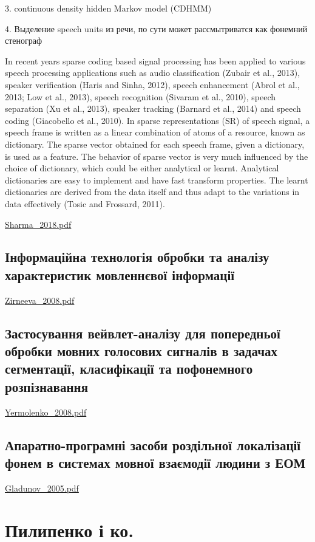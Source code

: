 3. continuous density hidden Markov model
(CDHMM)

4. Выделение speech units из речи, по сути может рассмытриватся как фонемний стенограф

In recent years sparse coding based signal processing has been applied to various speech processing applications
such as audio classification (Zubair et al., 2013), speaker verification (Haris and Sinha, 2012), speech
enhancement (Abrol et al., 2013; Low et al., 2013), speech recognition (Sivaram et al., 2010), speech
separation (Xu et al., 2013), speaker tracking (Barnard et al., 2014) and speech coding (Giacobello et al., 2010).
In sparse representations (SR) of speech signal, a speech frame is written as a linear combination of atoms of a
resource, known as dictionary. The sparse vector obtained for each speech frame, given a dictionary, is used as
a feature. The behavior of sparse vector is very much influenced by the choice of dictionary, which could be
either analytical or learnt. Analytical dictionaries are easy to implement and have fast transform properties. The
learnt dictionaries are derived from the data itself and thus adapt to the variations in data effectively (Tosic and
Frossard, 2011).

\url{Sharma_2018.pdf}\cite{Sharma_2018}

\subsection{Інформаційна технологія обробки та аналізу характеристик мовленнєвої інформації}

\url{Zirneeva_2008.pdf}\cite{Zirneeva_2008}

\subsection{Застосування вейвлет-аналізу для попередньої обробки мовних голосових сигналів в задачах сегментації, класифікації та пофонемного розпізнавання}

\url{Yermolenko_2008.pdf}\cite{Yermolenko_2008}

\subsection{Апаратно-програмні засоби роздільної локалізації фонем в системах мовної взаємодії людини з ЕОМ}

\url{Gladunov_2005.pdf}\cite{Gladunov_2005}

\section{Пилипенко і ко.}


